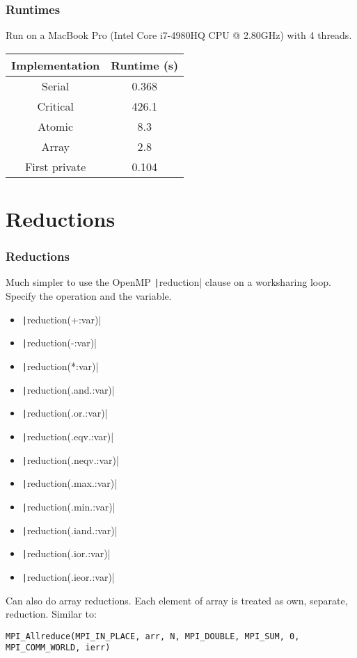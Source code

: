 \documentclass{beamer}
\begin{document}
\begin{frame}
\frametitle{Runtimes}
Run on a MacBook Pro (Intel Core i7-4980HQ CPU @ 2.80GHz) with 4 threads.

\begin{table}
\begin{tabular}{cc}
\toprule
Implementation & Runtime (s) \\
\midrule
Serial        & 0.368 \\
Critical      & 426.1 \\
Atomic        & 8.3 \\
Array         & 2.8 \\
First private & 0.104 \\
\bottomrule
\end{tabular}
\end{table}
\end{frame}

\section{Reductions}
\begin{frame}[fragile]
\frametitle{Reductions}
Much simpler to use the OpenMP \texttt|reduction| clause on a worksharing loop.
Specify the operation and the variable.
\begin{multicols}{2}
\begin{itemize}
  \item \texttt|reduction(+:var)|
  \item \texttt|reduction(-:var)|
  \item \texttt|reduction(*:var)|
  \item \texttt|reduction(.and.:var)|
  \item \texttt|reduction(.or.:var)|
  \item \texttt|reduction(.eqv.:var)|
  \item \texttt|reduction(.neqv.:var)|
  \item \texttt|reduction(.max.:var)|
  \item \texttt|reduction(.min.:var)|
  \item \texttt|reduction(.iand.:var)|
  \item \texttt|reduction(.ior.:var)|
  \item \texttt|reduction(.ieor.:var)|
\end{itemize}
\end{multicols}

Can also do array reductions. Each element of array is treated as own, separate, reduction.
Similar to:
\begin{verbatim}
MPI_Allreduce(MPI_IN_PLACE, arr, N, MPI_DOUBLE, MPI_SUM, 0, MPI_COMM_WORLD, ierr)
\end{verbatim}

\end{frame}
\end{document}

